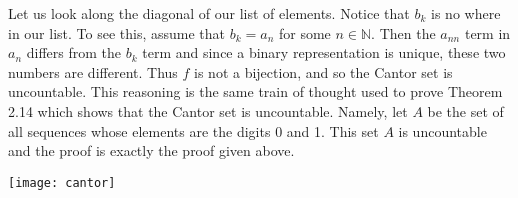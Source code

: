 \documentclass[12pt]{article}
\begin{document}
Let us look along the diagonal of our list of elements. Notice that $b_{k}$ is no where in our list. To see this, assume that $b_{k}=a_{n}$ for some $n \in \mathbb{N}$. Then the $a_{nn}$ term in $a_{n}$ differs from the $b_{k}$ term and since a binary representation is unique, these two numbers are different. Thus $f$ is not a bijection, and so the Cantor set is uncountable. This reasoning is the same train of thought used to prove Theorem 2.14 which shows that the Cantor set is uncountable. Namely, let $A$ be the set of all sequences whose elements are the digits 0 and 1. This set $A$ is uncountable and the proof is exactly the proof given above. \\

\centerline{\texttt{[image: cantor]}}
\end{document}
